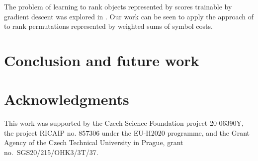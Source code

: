 \documentclass[runningheads]{llncs}
\begin{document}
The problem of learning to rank objects represented by scores trainable by gradient descent was explored in \cite{Burges2005}.
Our work can be seen to apply the approach of \cite{Burges2005} to rank permutations represented by weighted sums of symbol costs.


\section{Conclusion and future work}
\label{sec:conclusion}


\section*{Acknowledgments}



This work was supported by
the Czech Science Foundation project 20-06390Y,
the project RICAIP no. 857306 under the EU-H2020 programme,
and
the Grant Agency of the Czech Technical University in Prague, grant\\
no.~SGS20/215/OHK3/3T/37.





%
\end{document}
